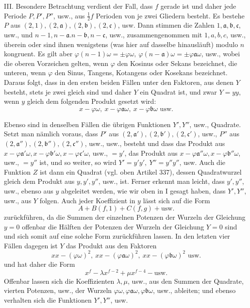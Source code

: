 III. Besondere Betrachtung verdient der Fall, dass \(f\) gerade ist und daher jede Periode \(P,\allowbreak P',\allowbreak P''\), usw., aus \(\tfrac12f\) Perioden von je zwei Gliedern besteht. Es bestehe \(P\) aus \((2,1),\allowbreak (2,\mathfrak{a}),\allowbreak (2,\mathfrak{b}),\allowbreak (2,\mathfrak{c})\), usw. Dann stimmen die Zahlen \(1,\allowbreak \mathfrak{a},\allowbreak \mathfrak{b},\allowbreak \mathfrak{c}\), usw., und \(n-1,\allowbreak n-\mathfrak{a}.n-\mathfrak{b},\allowbreak n-\mathfrak{c}\), usw., zusammengenommen mit \(1,\allowbreak a,\allowbreak b,\allowbreak c\), usw., überein oder sind ihnen wenigstens (was hier auf dasselbe hinausläuft) modulo \(n\) kongruent. Es gilt aber \(\varphi(n-1)\omega=\pm\varphi\omega,\allowbreak \ \varphi(n-\mathfrak{a})\omega=\pm\varphi \mathfrak{a}\omega\), usw., wobei die oberen Vorzeichen gelten, wenn \(\varphi\) den Kosinus oder Sekans bezeichnet, die unteren, wenn \(\varphi\) den Sinus, Tangens, Kotangens oder Kosekans bezeichnet. Daraus folgt, dass in den ersten beiden Fällen unter den Faktoren, aus denen \(Y\) besteht, stets je zwei gleich sind und daher \(Y\) ein Quadrat ist, und zwar \(Y=yy\), wenn \(y\) gleich dem folgenden Produkt gesetzt wird: \[x-\varphi\omega,\ x-\varphi \mathfrak{a}\omega,\ x-\varphi \mathfrak{b}\omega\text{ usw.}\]

Ebenso sind in denselben Fällen die übrigen Funktionen \(Y',\allowbreak Y''\), usw., Quadrate. Setzt man nämlich voraus, dass \(P'\) aus \((2,\mathfrak{a}'),\allowbreak (2,\mathfrak{b}'),\allowbreak (2,\mathfrak{c}')\), usw., \(P''\) aus \((2,\mathfrak{a}''),\allowbreak (2,\mathfrak{b}''),\allowbreak (2,\mathfrak{c}'')\), usw., usw., besteht und dass das Produkt aus \(x-\varphi \mathfrak{a}'\omega,\allowbreak x-\varphi \mathfrak{b}'\omega,\allowbreak x-\varphi \mathfrak{c}'\omega\), usw., \(=y'\), das Produkt aus \(x-\varphi \mathfrak{a}''\omega,\allowbreak x-\varphi \mathfrak{b}''\omega\), usw., \(=y''\) ist, und so weiter, so wird \(Y'=y'y',\allowbreak \ Y''=y''y''\), usw. Auch die Funktion \(Z\) ist dann ein Quadrat (vgl. oben Artikel 337), dessen Quadratwurzel gleich dem Produkt aus \(y,\allowbreak y',\allowbreak y''\), usw., ist. Ferner erkennt man leicht, dass \(y',\allowbreak y''\), usw., ebenso aus \(y\) abgeleitet werden, wie wir oben in I gesagt haben, dass \(Y',\allowbreak Y''\), usw., aus \(Y\) folgen. Auch jeder Koeffizient in \(y\) lässt sich auf die Form \[A+B(f,1)+C(f,g)+\text{usw.}\] zurückführen, da die Summen der einzelnen Potenzen der Wurzeln der Gleichung \(y=0\) offenbar die Hälften der Potenzen der Wurzeln der Gleichung \(Y=0\) sind und sich somit auf eine solche Form zurückführen lassen. In den letzten vier Fällen dagegen ist \(Y\) das Produkt aus den Faktoren \[xx-(\varphi\omega)^2,\ xx-(\varphi \mathfrak{a}\omega)^2,\ xx-(\varphi \mathfrak{b}\omega)^2\text{ usw.}\] und hat daher die Form \[x^f-\lambda x^{f-2}+\mu x^{f-4}-\text{usw.}\] Offenbar lassen sich die Koeffizienten \(\lambda,\allowbreak \mu\), usw., aus den Summen der Quadrate, vierten Potenzen, usw., der Wurzeln \(\varphi\omega,\allowbreak \varphi \mathfrak{a}\omega,\allowbreak \varphi \mathfrak{b}\omega\), usw., ableiten; und ebenso verhalten sich die Funktionen \(Y',\allowbreak Y''\), usw.

